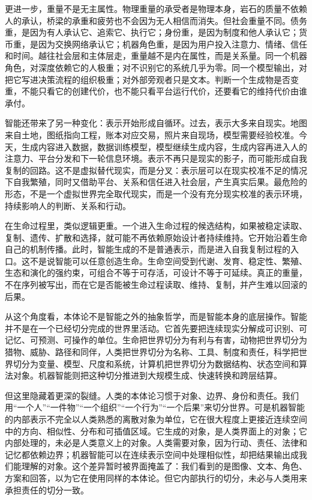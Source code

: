 更进一步，重量不是无主属性。物理重量的承受者是物理本身，岩石的质量不依赖人的承认，桥梁的承重和疲劳也不会因为无人相信而消失。但社会重量不同。债务重，是因为有人承认它、追索它、执行它；身份重，是因为制度和他人承认它；货币重，是因为交换网络承认它；机器角色重，是因为用户投入注意力、情绪、信任和时间。越往社会层和主体层走，重量越不是内在属性，而是关系量。同一个机器角色，对深度依赖它的人极重；对不识别它的系统几乎为零。同一个模型输出，对把它写进决策流程的组织极重；对外部旁观者只是文本。判断一个生成物是否变重，不能只看它的创建代价，也不能只看平台运行代价，还要看它的维持代价由谁承付。

智能还带来了另一种变化：表示开始形成自循环。过去，表示大多来自现实。地图来自土地，图纸指向工程，账本对应交易，照片来自现场，模型需要经验校准。今天，生成内容进入数据，数据训练模型\cite{shumailov2024ai}，模型继续生成内容，生成内容再进入人的注意力、平台分发和下一轮信息环境。表示不再只是现实的影子，而可能形成自我复制的回路。这不是虚拟替代现实，而是分叉：表示层可以在现实校准不足的情况下自我繁殖，同时又借助平台、关系和信任进入社会层，产生真实后果。最危险的形态，不是一个虚拟世界完全取代现实，而是一个没有充分现实校准的表示环境，持续影响人的判断、关系和行动。

在生命过程里，类似逻辑更重。一个进入生命过程的候选结构，如果被稳定读取、复制、遗传、扩散和选择，就可能不再依赖原始设计者持续维持。它开始沿着生命自己的机制传播。此时，智能生成的不是普通表示，而是进入自我复制过程的入口。这不是说智能可以任意创造生命。生命空间受到代谢、发育、稳定性、繁殖、生态和演化的强约束，可组合不等于可存活，可设计不等于可延续。真正的重量，不在序列被写出，而在它是否能被生命过程读取、维持、复制，并产生难以回滚的后果。


从这个角度看，本体论不是智能之外的抽象哲学，而是智能本身的底层操作。智能并不是在一个已经切分完成的世界里活动。它首先要把连续现实分解成可识别、可记忆、可预测、可操作的单位。生命把世界切分为有利与有害，动物把世界切分为猎物、威胁、路径和同伴，人类把世界切分为名称、工具、制度和责任，科学把世界切分为变量、模型、尺度和系统，计算机把世界切分为数据结构、状态空间和算法对象。机器智能则把这种切分推进到大规模生成、快速转换和跨层结算。

但这里隐藏着更深的裂缝。人类的本体论习惯于对象、边界、身份和责任。我们用“一个人”“一件物”“一个组织”“一个行为”“一个后果”来切分世界。可是机器智能的内部表示不完全以人类熟悉的离散对象为单位，它在很大程度上更接近连续空间中的方向、相似性、分布和可插值区域。它生成的对象，是人类界面上的对象；它内部处理的，未必是人类意义上的对象。人类需要对象，因为行动、责任、法律和记忆都依赖边界；机器智能可以在连续表示空间中处理相似性，却把结果输出成我们能理解的对象。这个差异暂时被界面掩盖了：我们看到的是图像、文本、角色、方案和回答，以为它在使用同样的本体论。但它内部执行的切分，未必与人类用来承担责任的切分一致。

